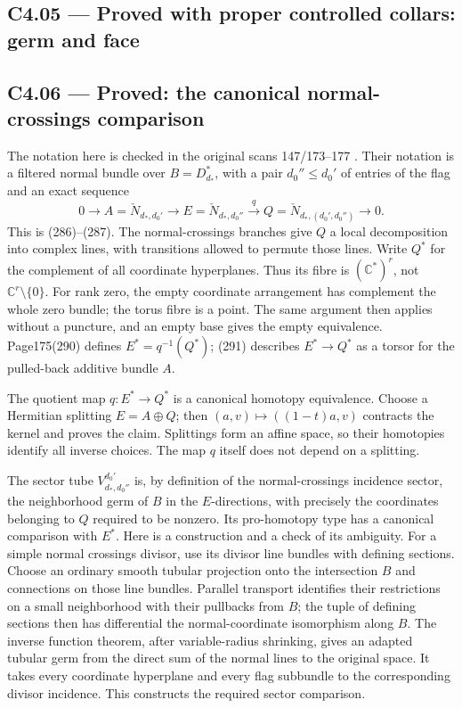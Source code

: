 \subsection{C4.05 --- Proved with proper controlled collars: germ and face}\label{c4.05-proved-with-proper-controlled-collars-germ-and-face}



\subsection{C4.06 --- Proved: the canonical normal-crossings comparison}\label{c4.06-proved-the-canonical-normal-crossings-comparison}

The notation here is checked in the original scans 147/173--177 \cite{C_Grothendieck147}. Their notation is a filtered normal bundle over \(B=D_{d_*}^*\), with a pair \(d_0''\le d_0'\) of entries of the flag and an exact sequence \[
 0\longrightarrow A=\check N_{d_*,d_0'}
 \longrightarrow E=\check N_{d_*,d_0''}
 \xrightarrow{q}Q=\check N_{d_*,(d_0',d_0'')}
 \longrightarrow0.
\] This is (286)--(287). The normal-crossings branches give \(Q\) a local decomposition into complex lines, with transitions allowed to permute those lines. Write \(Q^*\) for the complement of all coordinate hyperplanes. Thus its fibre is \((\mathbb C^*)^r\), not \(\mathbb C^r\setminus\{0\}\). For rank zero, the empty coordinate arrangement has complement the whole zero bundle; the torus fibre is a point. The same argument then applies without a puncture, and an empty base gives the empty equivalence. Page175(290) defines \(E^*=q^{-1}(Q^*)\); (291) describes \(E^*\to Q^*\) as a torsor for the pulled-back additive bundle \(A\).

The quotient map \(q:E^*\to Q^*\) is a canonical homotopy equivalence. Choose a Hermitian splitting \(E=A\oplus Q\); then \((a,v)\mapsto((1-t)a,v)\) contracts the kernel and proves the claim. Splittings form an affine space, so their homotopies identify all inverse choices. The map \(q\) itself does not depend on a splitting.

The sector tube \(V^{d_0'}_{d_*,d_0''}\) is, by definition of the normal-crossings incidence sector, the neighborhood germ of \(B\) in the \(E\)-directions, with precisely the coordinates belonging to \(Q\) required to be nonzero. Its pro-homotopy type has a canonical comparison with \(E^*\). Here is a construction and a check of its ambiguity. For a simple normal crossings divisor, use its divisor line bundles with defining sections. Choose an ordinary smooth tubular projection onto the intersection \(B\) and connections on those line bundles. Parallel transport identifies their restrictions on a small neighborhood with their pullbacks from \(B\); the tuple of defining sections then has differential the normal-coordinate isomorphism along \(B\). The inverse function theorem, after variable-radius shrinking, gives an adapted tubular germ from the direct sum of the normal lines to the original space. It takes every coordinate hyperplane and every flag subbundle to the corresponding divisor incidence. This constructs the required sector comparison.

